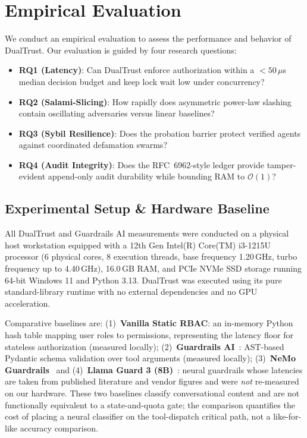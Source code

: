 \documentclass[manuscript, screen, review]{jair}
\begin{document}
\section{Empirical Evaluation}
\label{sec:evaluation}

We conduct an empirical evaluation to assess the performance and behavior of DualTrust. Our evaluation is guided by four research questions:
\begin{itemize}[leftmargin=12pt, topsep=2pt, itemsep=1pt]
\item \textbf{RQ1 (Latency)}: Can DualTrust enforce authorization within a $<50\,\mu$s median decision budget and keep lock wait low under concurrency?
\item \textbf{RQ2 (Salami-Slicing)}: How rapidly does asymmetric power-law slashing contain oscillating adversaries versus linear baselines?
\item \textbf{RQ3 (Sybil Resilience)}: Does the probation barrier protect verified agents against coordinated defamation swarms?
\item \textbf{RQ4 (Audit Integrity)}: Does the RFC~6962-style ledger provide tamper-evident append-only audit durability while bounding RAM to $\mathcal{O}(1)$?
\end{itemize}

\subsection{Experimental Setup \& Hardware Baseline}
All DualTrust and Guardrails AI measurements were conducted on a physical host workstation equipped with a 12th Gen Intel(R) Core(TM) i3-1215U processor (6 physical cores, 8 execution threads, base frequency 1.20\,GHz, turbo frequency up to 4.40\,GHz), 16.0\,GB RAM, and PCIe NVMe SSD storage running 64-bit Windows 11 and Python 3.13. DualTrust was executed using its pure standard-library runtime with no external dependencies and no GPU acceleration.

Comparative baselines are: (1)~\textbf{Vanilla Static RBAC}: an in-memory Python hash table mapping user roles to permissions, representing the latency floor for stateless authorization (measured locally); (2)~\textbf{Guardrails AI}~\cite{rajpal2024guardrails}: AST-based Pydantic schema validation over tool arguments (measured locally); (3)~\textbf{NeMo Guardrails}~\cite{rebedea2023nemo} and (4)~\textbf{Llama Guard 3 (8B)}~\cite{inan2023llama}: neural guardrails whose latencies are taken from published literature and vendor figures and were \emph{not} re-measured on our hardware. These two baselines classify conversational content and are not functionally equivalent to a state-and-quota gate; the comparison quantifies the cost of placing a neural classifier on the tool-dispatch critical path, not a like-for-like accuracy comparison.
\end{document}
